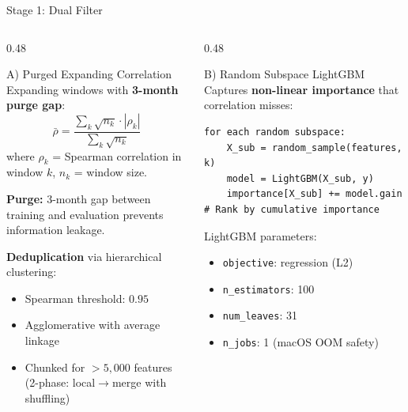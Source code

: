 \documentclass[aspectratio=169,10pt]{beamer}
\begin{document}
\begin{frame}[fragile]{Stage 1: Dual Filter}
\begin{columns}[T]
\begin{column}{0.48\textwidth}
\begin{block}{A) Purged Expanding Correlation}
\footnotesize
Expanding windows with \textbf{3-month purge gap}:
\[
\bar{\rho} = \frac{\sum_k \sqrt{n_k} \cdot |\rho_k|}{\sum_k \sqrt{n_k}}
\]
where $\rho_k$ = Spearman correlation in window $k$, $n_k$ = window size.

\textbf{Purge:} 3-month gap between training and evaluation prevents information leakage.

\textbf{Deduplication} via hierarchical clustering:
\begin{itemize}\scriptsize
  \item Spearman threshold: $0.95$
  \item Agglomerative with average linkage
  \item Chunked for $> 5{,}000$ features (2-phase: local$\to$merge with shuffling)
\end{itemize}
\end{block}
\end{column}
\begin{column}{0.48\textwidth}
\begin{block}{B) Random Subspace LightGBM}
\footnotesize
Captures \textbf{non-linear importance} that correlation misses:
\begin{lstlisting}[style=pseudo]
for each random subspace:
    X_sub = random_sample(features, k)
    model = LightGBM(X_sub, y)
    importance[X_sub] += model.gain
# Rank by cumulative importance
\end{lstlisting}

\vspace{0.1cm}
LightGBM parameters:
\begin{itemize}\scriptsize
  \item \texttt{objective}: regression (L2)
  \item \texttt{n\_estimators}: 100
  \item \texttt{num\_leaves}: 31
  \item \texttt{n\_jobs}: 1 (macOS OOM safety)
\end{itemize}
\end{block}
\end{column}
\end{columns}
\end{frame}
\end{document}
